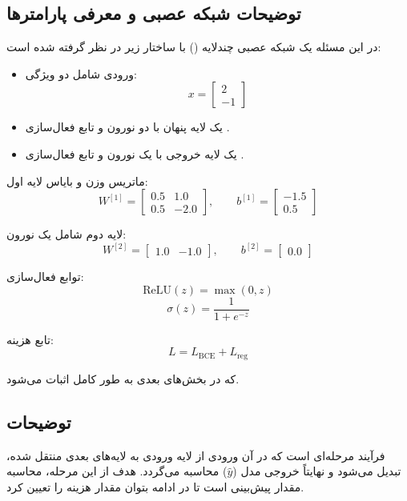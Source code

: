 \documentclass{article}
\begin{document}
\subsection{توضیحات شبکه عصبی و معرفی پارامترها}

در این مسئله یک شبکه عصبی چندلایه () با ساختار زیر در نظر گرفته شده است:

\begin{itemize}
	\item ورودی شامل دو ویژگی:  
	\[
	x = 
	\begin{bmatrix}
		2 \\
		-1
	\end{bmatrix}
	\]
	\item یک لایه پنهان با دو نورون و تابع فعال‌سازی .  
	\item یک لایه خروجی با یک نورون و تابع فعال‌سازی .  
\end{itemize}

ماتریس وزن و بایاس لایه اول:
\[
W^{[1]}=
\begin{bmatrix}
	0.5 & 1.0 \\
	0.5 & -2.0
\end{bmatrix},
\qquad
b^{[1]}=
\begin{bmatrix}
	-1.5 \\
	0.5
\end{bmatrix}
\]

لایه دوم شامل یک نورون:
\[
W^{[2]}=
\begin{bmatrix}
	1.0 & -1.0
\end{bmatrix},
\qquad
b^{[2]}=
\begin{bmatrix}
	0.0
\end{bmatrix}
\]

توابع فعال‌سازی:
\[
\text{ReLU}(z)=\max(0,z)
\]
\[
\sigma(z)=\frac{1}{1+e^{-z}}
\]

تابع هزینه:
\[
L = L_{\text{BCE}} + L_{\text{reg}}
\]

که در بخش‌های بعدی به طور کامل اثبات می‌شود.

\subsection{توضیحات  }

فرآیند  مرحله‌ای است که در آن ورودی از لایه ورودی به لایه‌های بعدی منتقل شده، تبدیل می‌شود و نهایتاً خروجی مدل (\(\hat{y}\)) محاسبه می‌گردد. هدف از این مرحله، محاسبه مقدار پیش‌بینی است تا در ادامه بتوان مقدار هزینه را تعیین کرد.
\end{document}
